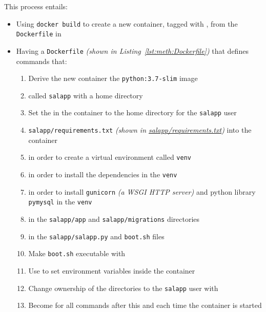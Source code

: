 \begin{enumerate}[leftmargin=0em,label=\protect\listlabelcircle{\arabic*}]
\begin{enumerate}[label=\Roman*~\textcolor{light-gray}{|}]
        This process entails:
        \begin{itemize}
          \item Using \texttt{docker build} to create a new container, tagged with , from the \texttt{Dockerfile} in 
          \item Having a \texttt{Dockerfile} \textit{(shown in Listing~\ref{lst:meth:Dockerfile})} that defines commands that:
            \begin{enumerate}[label=\textcolor{deep-gray}{\roman*\textasciitilde}]
              \item Derive the new container  the \texttt{python:3.7-slim} image
              \item {} called \texttt{salapp} with a home directory
              \item Set the  in the container to the home directory for the \texttt{salapp} user
              \item {} \texttt{salapp/requirements.txt} \textit{(shown in \hyperref[fcl:uswacs-2-iy2d502-salapp:requirements.txt]{salapp/requirements.txt})} into the container
              \item {} in order to create a virtual environment called \texttt{venv}
              \item {} in order to install the dependencies in the \texttt{venv}
              \item {} in order to install \texttt{gunicorn} \textit{(a WSGI HTTP server)} and python library \texttt{pymysql} in the \texttt{venv}
              \item {} in the \texttt{salapp/app} and \texttt{salapp/migrations} directories
              \item {} in the \texttt{salapp/salapp.py} and \texttt{boot.sh} files
              \item Make \texttt{boot.sh} executable with 
              \item Use  to set environment variables inside the container
              \item Change ownership of the directories to the \texttt{salapp} user with 
              \item Become  for all commands after this and each time the container is started

\end{enumerate}
\end{itemize}
\end{enumerate}
\end{enumerate}

